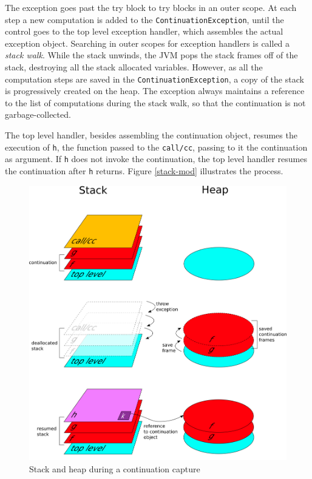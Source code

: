 \documentclass[12pt,a4paper,oneside,openright]{book}
\begin{document}
The exception goes past the try block to try blocks in an outer scope.
At each step a new computation is added to the
\texttt{ContinuationException}, until the control goes to the top level
exception handler, which assembles the actual exception object.
Searching in outer scopes for exception handlers is called a \emph{stack
walk}. While the stack unwinds, the JVM pops the stack frames off of the
stack, destroying all the stack allocated variables. However, as all the
computation steps are saved in the \texttt{ContinuationException}, a
copy of the stack is progressively created on the heap. The exception
always maintains a reference to the list of computations during the
stack walk, so that the continuation is not garbage-collected.

The top level handler, besides assembling the continuation object,
resumes the execution of \texttt{h}, the function passed to the
\texttt{call/cc}, passing to it the continuation as argument. If
\texttt{h} does not invoke the continuation, the top level handler
resumes the continuation after \texttt{h} returns. Figure
\ref{stack-mod} illustrates the process.

\begin{figure}[htbp]
\centering
\includegraphics{figures/frames.png}
\caption{Stack and heap during a continuation capture \label{frames}}
\end{figure}
\end{document}
